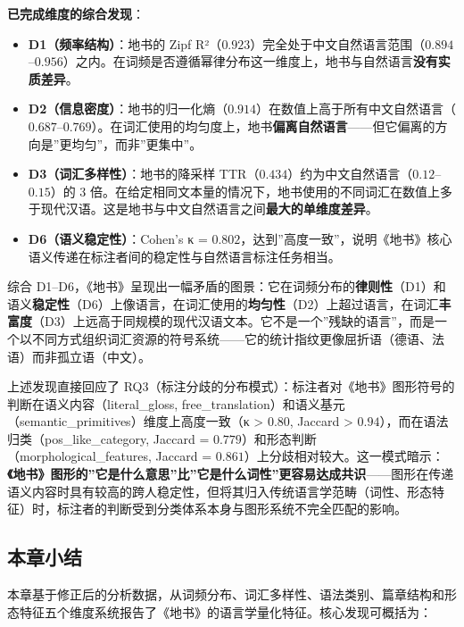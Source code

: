 \documentclass[12pt,a4paper,UTF8,fontset=founder]{ctexart}
\begin{document}
\textbf{已完成维度的综合发现}：

\begin{itemize}

\item
  \textbf{D1（频率结构）}：地书的 Zipf R²（$0.923$）完全处于中文自然语言范围（$0.894$--$0.956$）之内。在词频是否遵循幂律分布这一维度上，地书与自然语言\textbf{没有实质差异}。
\item
  \textbf{D2（信息密度）}：地书的归一化熵（$0.914$）在数值上高于所有中文自然语言（$0.687$--$0.769$）。在词汇使用的均匀度上，地书\textbf{偏离自然语言}------但它偏离的方向是''更均匀''，而非''更集中''。
\item
  \textbf{D3（词汇多样性）}：地书的降采样 TTR（$0.434$）约为中文自然语言（$0.12$--$0.15$）的 3 倍。在给定相同文本量的情况下，地书使用的不同词汇在数值上多于现代汉语。这是地书与中文自然语言之间\textbf{最大的单维度差异}。
\item
  \textbf{D6（语义稳定性）}：Cohen's κ = $0.802$，达到''高度一致''，说明《地书》核心语义传递在标注者间的稳定性与自然语言标注任务相当。
\end{itemize}

综合 D1--D6，《地书》呈现出一幅矛盾的图景：它在词频分布的\textbf{律则性}（D1）和语义\textbf{稳定性}（D6）上像语言，在词汇使用的\textbf{均匀性}（D2）上超过语言，在词汇\textbf{丰富度}（D3）上远高于同规模的现代汉语文本。它不是一个''残缺的语言''，而是一个以不同方式组织词汇资源的符号系统------它的统计指纹更像屈折语（德语、法语）而非孤立语（中文）。

上述发现直接回应了 RQ3（标注分歧的分布模式）：标注者对《地书》图形符号的判断在语义内容（literal\_gloss, free\_translation）和语义基元（semantic\_primitives）维度上高度一致（κ \textgreater{} $0.80$, Jaccard \textgreater{} $0.94$），而在语法归类（pos\_like\_category, Jaccard = $0.779$）和形态判断（morphological\_features, Jaccard = $0.861$）上分歧相对较大。这一模式暗示：\textbf{《地书》图形的''它是什么意思''比''它是什么词性''更容易达成共识}------图形在传递语义内容时具有较高的跨人稳定性，但将其归入传统语言学范畴（词性、形态特征）时，标注者的判断受到分类体系本身与图形系统不完全匹配的影响。

\subsection{本章小结}\label{ux672cux7ae0ux5c0fux7ed3-1}

本章基于修正后的分析数据，从词频分布、词汇多样性、语法类别、篇章结构和形态特征五个维度系统报告了《地书》的语言学量化特征。核心发现可概括为：
\end{document}
